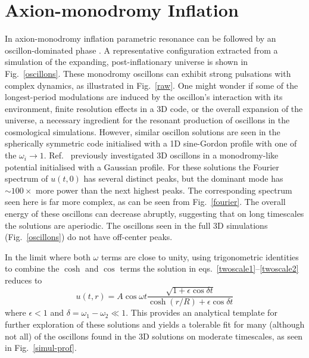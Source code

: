 \documentclass[%
reprint,
superscriptaddress,
amsmath,amssymb,
aps,
prd,
floatfix,
nofootinbib
]{revtex4-1}
\begin{document}

\section{Axion-monodromy Inflation}

In  axion-monodromy inflation  \cite{Silverstein:2008sg,McAllister:2008hb,Flauger:2009ab} parametric resonance can be followed by an oscillon-dominated phase  \cite{Amin:2011hj,Zhou:2013tsa}. A  representative configuration  extracted from a simulation of the expanding, post-inflationary universe \cite{Easther:2010qz} is shown in Fig.~\ref{oscillons}. These monodromy oscillons can exhibit strong pulsations with  complex dynamics, as illustrated in Fig.~\ref{raw}.  One might wonder if some of the longest-period modulations are induced by the oscillon's interaction with its environment,  finite resolution effects in a 3D code, or the overall expansion of the universe, a necessary  ingredient for the resonant production of oscillons in the cosmological simulations. However, similar oscillon solutions are seen in the spherically symmetric code initialised with a 1D sine-Gordon profile with one of the $\omega_i\to1$. Ref.~\cite{Salmi:2012ta} previously investigated 3D oscillons in a monodromy-like potential initialised with a Gaussian profile. For these solutions the Fourier spectrum of $u(t,0)$ has several distinct peaks, but the dominant mode has $\sim 100\times$ more power than the next highest peaks. The corresponding spectrum seen here is far more complex,  as can be seen from  Fig.~\ref{fourier}. The overall energy of these oscillons can decrease abruptly, suggesting that on long timescales the solutions are aperiodic. The oscillons seen in the full 3D simulations (Fig.~\ref{oscillons}) do not have off-center peaks.  

In the limit where  both $\omega$ terms are  close to unity, using trigonometric identities to combine the $\cosh$ and $\cos$ terms the solution in eqs.~\ref{twoscale1}--\ref{twoscale2} reduces to
%
\begin{equation} \label{fitprof}
  u(t,r) = A\cos\omega t \frac{\sqrt{1+\epsilon \cos \delta t}}{\cosh(r/R) + \epsilon \cos \delta t}
\end{equation}
where $\epsilon<1$ and $\delta = \omega_1-\omega_2 \ll 1$. This provides an analytical template for further exploration of these solutions and yields a tolerable fit for many (although not all) of the oscillons found in the 3D solutions on moderate timescales, as seen in Fig.~\ref{simul-prof}. 
\end{document}
